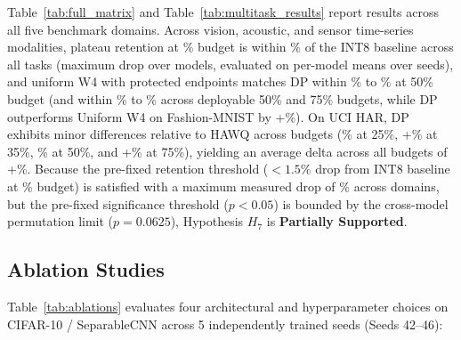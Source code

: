 \documentclass{ieeeaccess}
\begin{document}
Table~\ref{tab:full_matrix} and Table~\ref{tab:multitask_results} report results across all five benchmark domains. Across vision, acoustic, and sensor time-series modalities, plateau retention at \MacroThresholdBudgetPct\% budget is within \MacroPlateauRetentionDropMax\% of the INT8 baseline across all tasks (maximum drop over models, evaluated on per-model means over seeds), and uniform W4 with protected endpoints matches DP within \MacroDPUniformWFourMinFifty\% to \MacroDPUniformWFourMaxFifty\% at 50\% budget (and within \MacroDPUniformWFourMinCombined\% to \MacroDPUniformWFourMaxCombined\% across deployable 50\% and 75\% budgets, while DP outperforms Uniform W4 on Fashion-MNIST by +\MacroFMNISTFiftyUniformWFourAdv\%). On UCI HAR, DP exhibits minor differences relative to HAWQ across budgets (\MacroHARDeltasTwentyFive\% at 25\%, +\MacroHARDeltasThirtyFive\% at 35\%, \MacroHARDeltasFifty\% at 50\%, and +\MacroHARDeltasSeventyFive\% at 75\%), yielding an average delta across all budgets of +\MacroHARDeltasMean\%. Because the pre-fixed retention threshold ($<1.5\%$ drop from INT8 baseline at \MacroThresholdBudgetPct\% budget) is satisfied with a maximum measured drop of \MacroPlateauRetentionDropMax\% across domains, but the pre-fixed significance threshold ($p < 0.05$) is bounded by the cross-model permutation limit ($p = 0.0625$), Hypothesis $H_7$ is \textbf{Partially Supported}.

\subsection{Ablation Studies}
Table~\ref{tab:ablations} evaluates four architectural and hyperparameter choices on CIFAR-10 / SeparableCNN across 5 independently trained seeds (Seeds 42--46):


\end{document}
